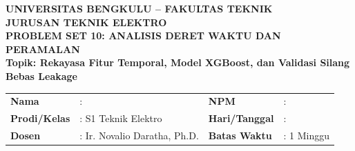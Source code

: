 \documentclass[11pt,a4paper]{article}
\begin{document}
\begin{center}
    {\large \textbf{\color{primaryblue}UNIVERSITAS BENGKULU -- FAKULTAS TEKNIK}}\\[0.1cm]
    {\large \textbf{\color{secondaryblue}JURUSAN TEKNIK ELEKTRO}}\\[0.2cm]
    {\LARGE \textbf{\color{primaryblue}PROBLEM SET 10: ANALISIS DERET WAKTU DAN PERAMALAN}}\\[0.1cm]
    {\normalsize \textbf{Topik: Rekayasa Fitur Temporal, Model XGBoost, dan Validasi Silang Bebas Leakage}}
\end{center}

\vspace{0.1cm}

\begin{tcolorbox}[colback=boxbg,colframe=primaryblue,arc=2mm,title=\textbf{Informasi Tugas \& Identitas Mahasiswa}]
\small
\begin{tabular}{p{2.2cm}p{5.5cm}p{2.2cm}p{5.0cm}}
\textbf{Nama} & : \dotfill & \textbf{NPM} & : \dotfill \\
\textbf{Prodi/Kelas} & : S1 Teknik Elektro & \textbf{Hari/Tanggal} & : \dotfill \\
\textbf{Dosen} & : Ir. Novalio Daratha, Ph.D. & \textbf{Batas Waktu} & : 1 Minggu \\
\end{tabular}
\end{tcolorbox}

\vspace{0.2cm}
\end{document}
